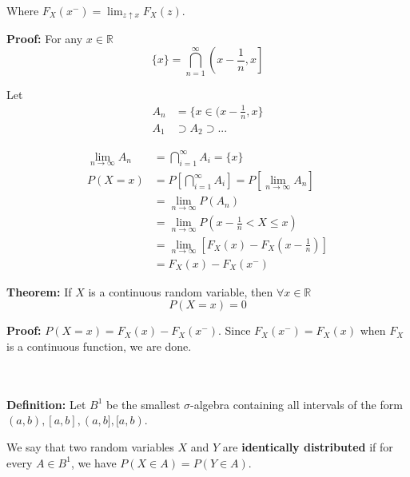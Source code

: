 \documentclass{article}
\begin{document}
Where $F_X(x^-) = \lim_{z\uparrow x}F_X(z)$.

\noindent \textbf{Proof:} For any $x \in \mathbb{R}$
\begin{equation*}
    \{x\} = \bigcap\limits_{n=1}^\infty \left(x-\frac{1}{n}, x\right]
\end{equation*}

Let 
\begin{equation*}
\begin{split}
    A_n &= \{x \in (x - \frac{1}{n}, x \}\\
    A_1 &\supset A_2 \supset ...
\end{split}
\end{equation*}

\begin{equation*}
\begin{split}
    \lim_{n\to\infty} A_n &= \bigcap\limits_{i=1}^\infty A_i = \{x\}\\
    P(X = x) &= P\left[\bigcap\limits_{i=1}^\infty A_i \right]= P\left[\lim_{n\to\infty} A_n \right]\\
    &= \lim_{n\to\infty} P(A_n)\\
    &= \lim_{n\to\infty} P(x-\frac{1}{n} < X \leq x)\\
    &= \lim_{n\to\infty} \left[F_X(x) - F_X(x- \frac{1}{n}) \right]\\
    &= F_X(x) - F_X(x^-)
\end{split}
\end{equation*}


\noindent \textbf{Theorem:} If $X$ is a continuous random variable, then $\forall x \in \mathbb{R}$
\begin{equation*}
    P(X=x) = 0
\end{equation*}

\noindent \textbf{Proof:} $P(X = x) = F_X(x) - F_X(x^-)$. Since $F_X(x^-) = F_X(x)$ when $F_X$ is a continuous function, we are done. 

\\~\\

\noindent \textbf{Definition:} Let $B^1$ be the smallest $\sigma$-algebra containing all intervals of the form $(a,b), [a,b], (a,b], [a,b)$.

We say that two random variables $X$ and $Y$ are \textbf{identically distributed} if for every $A \in B^{1}$, we have $P(X \in A) = P(Y \in A)$.

\\~\\
\end{document}
